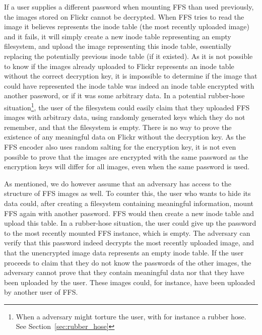 If a user supplies a different password when mounting FFS than used previously, the images stored on Flickr cannot be decrypted. When FFS tries to read the image it believes represents the inode table (the most recently uploaded image) and it fails, it will simply create a new inode table representing an empty filesystem, and upload the image representing this inode table, essentially replacing the potentially previous inode table (if it existed). As it is not possible to know if the images already uploaded to Flickr represents an inode table without the correct decryption key, it is impossible to determine if the image that could have represented the inode table was indeed an inode table encrypted with another password, or if it was some arbitrary data. In a potential rubber-hose situation\footnote{When a adversary might torture the user, with for instance a rubber hose. See Section~\ref{sec:rubber_hose}}, the user of the filesystem could easily claim that they uploaded FFS images with arbitrary data, using randomly generated keys which they do not remember, and that the filesystem is empty. There is no way to prove the existence of any meaningful data on Flickr without the decryption key. As the FFS encoder also uses random salting for the encryption key, it is not even possible to prove that the images are encrypted with the same password as the encryption keys will differ for all images, even when the same password is used. 

As mentioned, we do however assume that an adversary has access to the structure of FFS images as well. To counter this, the user who wants to hide its data could, after creating a filesystem containing meaningful information, mount FFS again with another password. FFS would then create a new inode table and upload this table. In a rubber-hose situation, the user could give up the password to the most recently mounted FFS instance, which is empty. The adversary can verify that this password indeed decrypts the most recently uploaded image, and that the unencrypted image data represents an empty inode table. If the user proceeds to claim that they do not know the passwords of the other images, the adversary cannot prove that they contain meaningful data nor that they have been uploaded by the user. These images could, for instance, have been uploaded by another user of FFS.